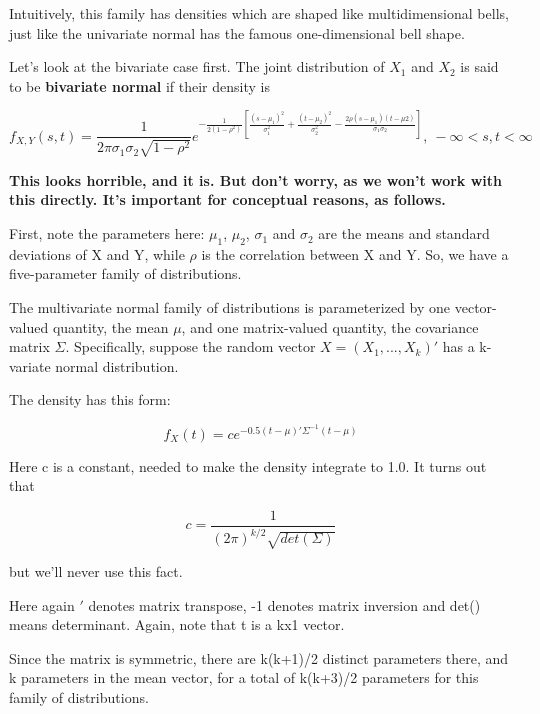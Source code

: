 Intuitively, this family has densities which are shaped like
multidimensional bells, just like the univariate normal has the famous
one-dimensional bell shape.  

Let's look at the bivariate case first.  The joint distribution of
$X_1$ and $X_2$ is said to be {\bf bivariate normal} if their density is

\begin{equation}
f_{X,Y}(s,t) = \frac{1}{2\pi \sigma_1 \sigma_2 \sqrt{1-\rho^2}}
e^
{-\frac{1}{2(1-\rho^2)} 
\left [
\frac{(s-\mu_1)^2}{\sigma_1^2} + \frac{(t-\mu_2)^2}{\sigma_2^2} 
-\frac
{2\rho (s-\mu_1)(t-\mu2)}
{\sigma_1 \sigma_2}
\right ]
}, ~ -\infty < s,t < \infty
\end{equation}

{\bf This looks horrible, and it is.  But don't worry, as we won't work
with this directly.  It's important for conceptual reasons, as follows.}

First, note the parameters here:  $\mu_1$, $\mu_2$, $\sigma_1$ and
$\sigma_2$ are the means and standard deviations of X and Y,
while $\rho$ is the correlation between X and Y.  So, we have a
five-parameter family of distributions.

The multivariate normal family of distributions is parameterized by one
vector-valued quantity, the mean $\mu$, and one matrix-valued quantity,
the covariance matrix $\Sigma$.  Specifically, suppose the random vector
$X = (X_1,...,X_k)'$ has a k-variate normal distribution.

The density has this form:

\begin{equation}
\label{bigbell}
f_X(t) = c e^{-0.5 (t-\mu)'\Sigma^{-1}(t-\mu)}
\end{equation}

Here c is a constant, needed to make the density integrate to 1.0.  It
turns out that 

\begin{equation}
c = \frac
{1}
{(2\pi)^{k/2} \sqrt{det(\Sigma)}}
\end{equation}

but we'll never use this fact.

Here again $'$ denotes matrix transpose, -1 denotes matrix inversion and det()
means determinant.  Again, note that t is a kx1 vector.  

Since the matrix is symmetric, there are k(k+1)/2 distinct parameters
there, and k parameters in the mean vector, for a total of k(k+3)/2
parameters for this family of distributions.


